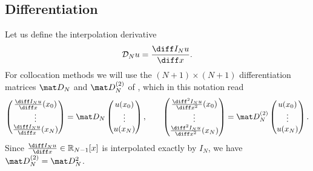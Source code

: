 \subsection{Differentiation}

Let us define the interpolation derivative
\begin{equation*}
    \mathcal D_N u = \frac{\diff I_N u}{\diff x}.
\end{equation*}
For collocation methods we will use the $(N+1) \times (N+1)$ differentiation matrices $\mat D_N$ and $\mat D^{(2)}_N$ of , which in this notation read
\begin{equation*}
    \begin{pmatrix}
        \frac{\diff I_N u}{\diff x} (x_0) \\
        \vdots                   \\
        \frac{\diff I_N u}{\diff x} (x_{N})
    \end{pmatrix}
    =
    \mat D_N
    \begin{pmatrix}
        u(x_0)      \\
        \vdots      \\
        u(x_N)
    \end{pmatrix},
    \qquad
    \begin{pmatrix}
        \frac{\diff^2 I_N u}{\diff x^2} (x_0) \\
        \vdots                       \\
        \frac{\diff^2 I_N u}{\diff x^2} (x_{N})
    \end{pmatrix}
    =
    \mat D^{(2)}_N
    \begin{pmatrix}
        u(x_0)      \\
        \vdots      \\
        u(x_N)
    \end{pmatrix}.
\end{equation*}
Since $\frac{\diff I_N u}{\diff x} \in \mathbb R_{N-1}[x]$ is interpolated exactly by $I_N$, we have $\mat D^{(2)}_N = \mat D_N^2$.

